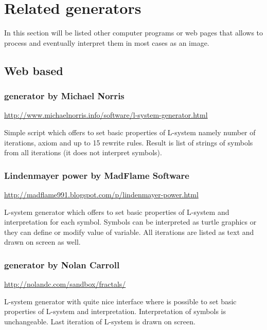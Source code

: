 
\section{Related \lsystem generators}

In this section will be listed other computer programs or web pages that allows to process \lsystems and eventually interpret them in most cases as an image.

\subsection{Web based}
\label{sec:WebBasedGenerators}

\subsubsection{\lsystem generator by Michael Norris}
{ \vspace{-10pt} \footnotesize \url{http://www.michaelnorris.info/software/l-system-generator.html} }

Simple script which offers to set basic properties of L-system namely number of iterations, axiom and up to 15 rewrite rules.
Result is list of strings of symbols from all iterations (it does not interpret symbols).


\subsubsection{Lindenmayer power by MadFlame Software}
{ \vspace{-10pt} \footnotesize \url{http://madflame991.blogspot.com/p/lindenmayer-power.html} }

L-system generator which offers to set basic properties of L-system and interpretation for each symbol.
Symbols can be interpreted as turtle graphics or they can define or modify value of variable.
All iterations are listed as text and drawn on screen as well.


\subsubsection{\lsystem generator by Nolan Carroll}	
{ \vspace{-10pt} \footnotesize \url{http://nolandc.com/sandbox/fractals/} }

L-system generator with quite nice interface where is possible to set basic properties of L-system and interpretation.
Interpretation of symbols is unchangeable.
Last iteration of L-system is drawn on screen.


